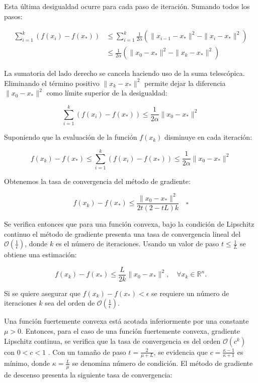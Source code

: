 \documentclass[conference]{IEEEtran}
\begin{document}
Esta última desigualdad ocurre para cada paso de iteración. Sumando todos los pasos:

\begin{align*}
\sum_{i=1}^{k} (f(x_{i}) - f(x_{*})) &\leq \sum_{i=1}^{k} \frac{1}{2\alpha} \left( \|x_{i-1} - x_{*}\|^{2} - \|x_{i} - x_{*}\|^{2} \right) \\
&\leq \frac{1}{2\alpha} \left( \|x_{0} - x_{*}\|^{2} - \|x_{k} - x_{*}\|^{2} \right)
\end{align*}

La sumatoria del lado derecho se cancela haciendo uso de la suma telescópica. Eliminando el término positivo \( \|x_{k} - x_{*}\|^{2} \) permite dejar la diferencia \( \|x_{0} - x_{*}\|^{2} \) como límite superior de la desigualdad:

\[
\sum_{i=1}^{k} (f(x_{i}) - f(x_{*})) \leq \frac{1}{2\alpha} \|x_{0} - x_{*}\|^{2}
\]

Suponiendo que la evaluación de la función \( f(x_{k}) \) disminuye en cada iteración:

\[
f(x_{k}) - f(x_{*}) \leq \sum_{i=1}^{k} (f(x_{i}) - f(x_{*})) \leq \frac{1}{2\alpha} \|x_{0} - x_{*}\|^{2}
\]

Obtenemos la tasa de convergencia del método de gradiente:

\[
f(x_{k}) - f(x_{*}) \leq \frac{\|x_{0} - x_{*}\|^{2}}{2t(2 - tL)k} \quad \square \tag{2.13}
\]

Se verifica entonces que para una función convexa, bajo la condición de Lipschitz continuo el método de gradiente presenta una tasa de convergencia lineal del \( \mathcal{O}(\frac{1}{\epsilon}) \), donde \( k \) es el número de iteraciones. Usando un valor de paso \( t \leq \frac{1}{L} \) se obtiene una estimación:

\[
f(x_{k}) - f(x_{*}) \leq \frac{L}{2k} \|x_{0} - x_{*}\|^{2}, \quad \forall x_{k} \in \mathbb{R}^{n}. \tag{2.14}
\]

Si se quiere asegurar que \( f(x_{k}) - f(x_{*}) < \epsilon \) se requiere un número de iteraciones \( k \) sea del orden de \( \mathcal{O}(\frac{1}{\epsilon}) \).

Una función fuertemente convexa está acotada inferiormente por una constante \( \mu > 0 \). Entonces, para el caso de una función fuertemente convexa, gradiente Lipschitz continua, se verifica que la tasa de convergencia es del orden \( \mathcal{O}(c^{k}) \) con \( 0 < c < 1 \) \cite{ref15, ref8}. Con un tamaño de paso \( t = \frac{2}{\mu + L} \), se evidencia que \( c = \frac{\kappa - 1}{\kappa + 1} \) es mínimo, donde \( \kappa = \frac{L}{\mu} \) se denomina número de condición. El método de gradiente de descenso presenta la siguiente tasa de convergencia:
\end{document}
